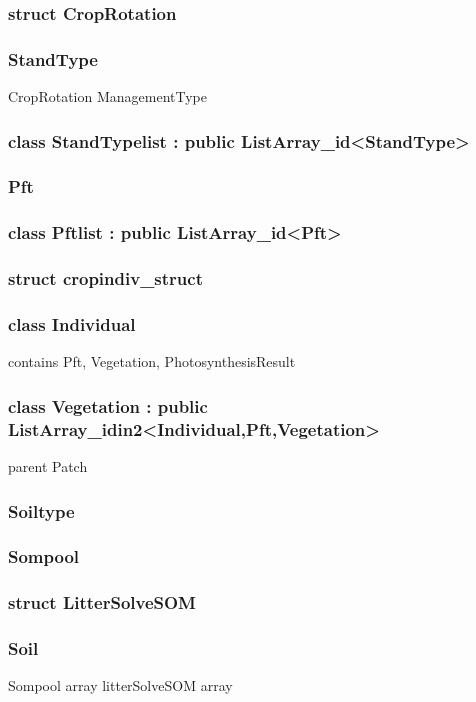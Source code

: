 \subsubsection{struct CropRotation}
\subsubsection{StandType}
CropRotation
ManagementType

\subsubsection{class StandTypelist : public ListArray_id<StandType> }
\subsubsection{Pft}
\subsubsection{class Pftlist : public ListArray_id<Pft>}
\subsubsection{struct cropindiv_struct}
\subsubsection{class Individual}
contains Pft, Vegetation, PhotosynthesisResult

\subsubsection{class Vegetation : public ListArray_idin2<Individual,Pft,Vegetation>}
parent Patch

\subsubsection{Soiltype}
\subsubsection{Sompool}
\subsubsection{struct LitterSolveSOM }
\subsubsection{Soil}
  Sompool array
  litterSolveSOM array


